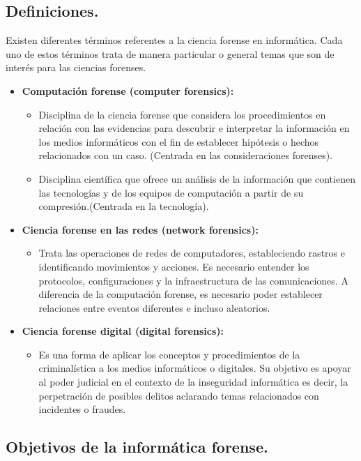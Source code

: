 \subsection{Definiciones.}

Existen diferentes términos referentes a la ciencia forense en informática. Cada uno de estos términos trata de manera particular o general temas que son de interés para las ciencias forenses.

\begin{itemize}
    \item \textbf{Computación forense (computer forensics):}
    \begin{itemize}
        \item Disciplina de la ciencia forense que considera los procedimientos en relación con las evidencias para descubrir e interpretar la información en los medios informáticos con el fin de establecer hipótesis o hechos relacionados con un caso. (Centrada en las consideraciones forenses).
        \item Disciplina científica que ofrece un análisis de la información que contienen las tecnologías y de los equipos de computación a partir de su compresión.(Centrada en la tecnología).
    \end{itemize}
    \item \textbf{Ciencia forense en las redes (network forensics):}
    \begin{itemize}
        \item Trata las operaciones de redes de computadores, estableciendo rastros e identificando movimientos y acciones. Es necesario entender los protocolos, configuraciones y la infraestructura de las comunicaciones. A diferencia de la computación forense, es necesario poder establecer relaciones entre eventos diferentes e incluso aleatorios.
    \end{itemize}
    \item \textbf{Ciencia forense digital (digital forensics):}
    \begin{itemize}
        \item Es una forma de aplicar los conceptos y procedimientos de la criminalística a los medios informáticos o digitales. Su objetivo es apoyar al poder judicial en el contexto de la inseguridad informática es decir, la perpetración de posibles delitos aclarando temas relacionados con incidentes o fraudes.
    \end{itemize}
\end{itemize}

\subsection{Objetivos de la informática forense.}

